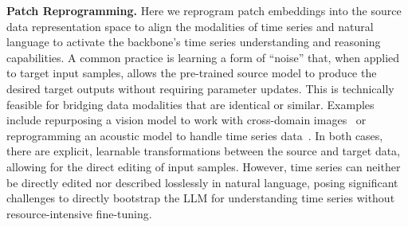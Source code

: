 \noindent\textbf{Patch Reprogramming.} 
Here we reprogram patch embeddings into the source data representation space to align the modalities of time series and natural language to activate the backbone's time series understanding and reasoning capabilities. A common practice is learning a form of ``noise'' that, when applied to target input samples, allows the pre-trained source model to produce the desired target outputs without requiring parameter updates. This is technically feasible for bridging data modalities that are identical or similar. Examples include repurposing a vision model to work with cross-domain images~\citep{misra2023reprogramming} or reprogramming an acoustic model to handle time series data~\citep{yang2021voice2series}. In both cases, there are explicit, learnable transformations between the source and target data, allowing for the direct editing of input samples. However, time series can neither be directly edited nor described losslessly in natural language, posing significant challenges to directly bootstrap the LLM for understanding time series without resource-intensive fine-tuning.

